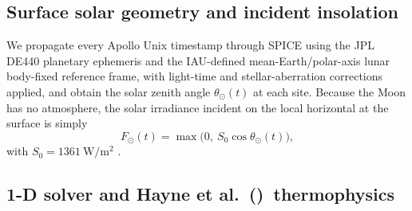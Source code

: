 \documentclass[11pt]{article}
\newcommand{\Hayne}{Hayne et al.\ (\citeyear{hayne2017})}
\begin{document}
\subsection{Surface solar geometry and incident insolation}
We propagate every Apollo Unix timestamp through SPICE
\citep{acton1996,acton2018} using the JPL DE440 planetary ephemeris and
the IAU-defined mean-Earth/polar-axis lunar body-fixed reference frame,
with light-time and stellar-aberration corrections applied, and obtain
the solar zenith angle $\theta_\odot(t)$ at each site. Because the Moon
has no atmosphere, the solar irradiance incident on the local horizontal
at the surface is simply
\begin{equation}
F_\odot(t) = \max\bigl(0,\ S_0\cos\theta_\odot(t)\bigr),
\label{eq:insolation}
\end{equation}
with $S_0 = \SI{1361}{\watt\per\meter\squared}$ \citep{kopp2011}.

\subsection{1-D solver and \Hayne\ thermophysics}\label{sec:solver}
\end{document}
